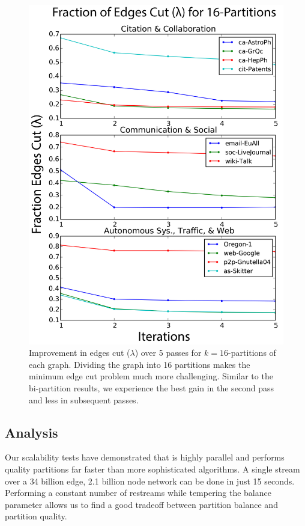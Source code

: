 \begin{figure}[t!]
\centering
\includegraphics[width=0.9\columnwidth] {figures/real_k16_lambda.pdf}
\caption[Caption for]{Improvement in edges cut ($\lambda$) over 5 passes for $k=16$-partitions of each graph. Dividing the graph into 16 partitions makes the minimum edge cut problem much more challenging. Similar to the bi-partition results, we experience the best gain in the second pass and less in subsequent passes.}
\label{fig:k16_lambda}
\end{figure}

\subsection{Analysis}
Our scalability tests have demonstrated that \ourmethod is highly parallel and performs quality partitions far faster than more sophisticated algorithms. A single stream over a 34 billion edge, 2.1 billion node network can be done in just 15 seconds. Performing a constant number of restreams while tempering the balance parameter allows us to find a good tradeoff between partition balance and partition quality. 

